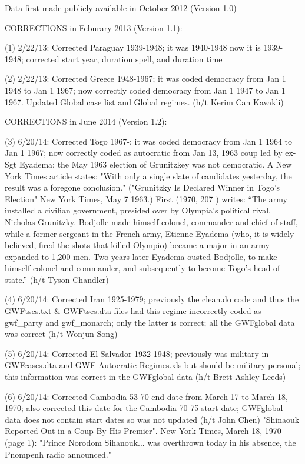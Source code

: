 Data first made publicly available in October 2012 (Version 1.0)


CORRECTIONS in Feburary 2013 (Version 1.1): 

(1) 2/22/13: Corrected Paraguay 1939-1948; it was 1940-1948 now it is 1939-1948; corrected start year, duration spell, and duration time

(2) 2/22/13: Corrected Greece 1948-1967; it was coded democracy from Jan 1 1948 to Jan 1 1967; now correctly coded democracy from Jan 1 1947 to Jan 1 1967. Updated Global case list and Global regimes. (h/t Kerim Can Kavakli)


CORRECTIONS in June 2014 (Version 1.2): 

(3) 6/20/14: Corrected Togo 1967-; it was coded democracy from Jan 1 1964 to Jan 1 1967; now correctly coded as autocratic from Jan 13, 1963 coup led by ex-Sgt Eyadema; the May 1963 election of Grunitzkey was not democratic. A New York Times article states: "With only a single slate of candidates yesterday, the result was a foregone conclusion."  ("Grunitzky Is Declared Winner in Togo's Election" New York Times, May 7 1963.)  First (1970, 207 ) writes: ``The army installed a civilian government, presided over by Olympia's political rival, Nicholas Grunitzky. Bodjolle made himself colonel, commander and chief-of-staff, while a former sergeant in the French army, Etienne Eyadema (who, it is widely believed, fired the shots that killed Olympio) became a major in an army expanded to 1,200 men. Two years later Eyadema ousted Bodjolle, to make himself colonel and commander, and subsequently to become Togo's head of state.'' (h/t Tyson Chandler)

(4) 6/20/14: Corrected Iran 1925-1979; previously the clean.do code and thus the GWFtscs.txt & GWFtscs.dta files had this regime incorrectly coded as gwf_party and gwf_monarch; only the latter is correct; all the GWFglobal data was correct (h/t Wonjun Song)

(5) 6/20/14: Corrected El Salvador 1932-1948; previously was military in GWFcases.dta and GWF Autocratic Regimes.xls but should be military-personal; this information was correct in the GWFglobal data (h/t Brett Ashley Leeds)

(6) 6/20/14: Corrected Cambodia 53-70 end date from March 17 to March 18, 1970; also corrected this date for the Cambodia 70-75 start date; GWFglobal data does not contain start dates so was not updated  (h/t John Chen) "Shinaouk Reported Out in a Coup By His Premier". New York Times, March 18, 1970 (page 1): "Prince Norodom Sihanouk... was overthrown today in his absence, the Pnompenh radio announced."

